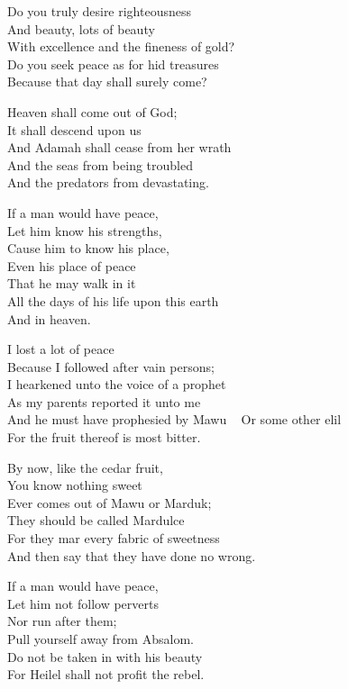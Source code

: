 \documentclass[
]{book}
\begin{document}
Do you truly desire righteousness\\
And beauty, lots of beauty\\
With excellence and the fineness of gold?\\
Do you seek peace as for hid treasures\\
Because that day shall surely come?

Heaven shall come out of God;\\
It shall descend upon us\\
And Adamah shall cease from her wrath\\
And the seas from being troubled\\
And the predators from devastating.

If a man would have peace,\\
Let him know his strengths,\\
Cause him to know his place,\\
Even his place of peace\\
That he may walk in it\\
All the days of his life upon this earth\\
And in heaven.

I lost a lot of peace\\
Because I followed after vain persons;\\
I hearkened unto the voice of a prophet\\
As my parents reported it unto me\\
And he must have prophesied by Mawu ~
Or some other elil\\
For the fruit thereof is most bitter.

By now, like the cedar fruit,\\
You know nothing sweet\\
Ever comes out of Mawu or Marduk;\\
They should be called Mardulce\\
For they mar every fabric of sweetness\\
And then say that they have done no wrong.

If a man would have peace,\\
Let him not follow perverts\\
Nor run after them;\\
Pull yourself away from Absalom.\\
Do not be taken in with his beauty\\
For Heilel shall not profit the rebel.
\end{document}
